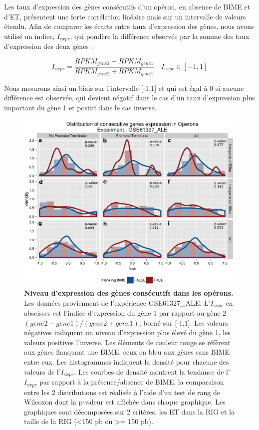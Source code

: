 \documentclass[12pt,a4paper]{report}
\begin{document}
\begin{onehalfspace}
Les taux d'expression des gènes consécutifs d'un opéron, en absence de BIME et d'ET, présentent une forte corrélation linéaire mais sur un intervalle de valeurs étendu. Afin de comparer les écarts entre taux d'expression des gènes, nous avons utilisé un indice, $I_{expr}$, qui pondère la différence observée par la somme des taux d'expression des deux gènes :

\[ I_{expr} = \frac{RPKM_{gene2} - RPKM_{gene1}}{RPKM_{gene2} + RPKM_{gene1}} \quad I_{expr} \in [-1,1]\]

Nous mesurons ainsi un biais sur l'intervalle [-1,1] et qui est égal à 0 si aucune différence est observée, qui devient négatif dans le cas d'un taux d'expression plus important du gène 1 et positif dans le cas inverse.

\begin{figure}[h!]
\centerline{\includegraphics[scale=0.2]{figures/genesOperon_histoDens_GSE61327_ALE.png}}
\caption{\textbf{Niveau d'expression des gènes consécutifs dans les opérons.} Les données proviennent de l'expérience GSE61327\_ALE. L'$I_{expr}$ en abscisses est l'indice d'expression du gène 1 par rapport au gène 2 $(gene2 - gene1) / (gene2 + gene1)$, borné sur [-1,1]. Les valeurs négatives indiquent un niveau d'expression plus élevé du gène 1, les valeurs positives l'inverse. Les éléments de couleur rouge se réfèrent aux gènes flanquant une BIME, ceux en bleu aux gènes sans BIME entre eux. Les histogrammes indiquent la densité pour chacune des valeurs de l'$I_{expr}$. Les courbes de densité montrent la tendance de l'$I_{expr}$ par rapport à la présence/absence de BIME, la comparaison entre les 2 distributions est réalisée à l'aide d'un test de rang de Wilcoxon dont la p-valeur est affichée dans chaque graphique. Les graphiques sont décomposées sur 2 critères, les ET dans la RIG et la taille de la RIG (<150 pb ou >= 150 pb).}
\label{fig:expression_operon}
\end{figure}


\end{onehalfspace}
\end{document}
